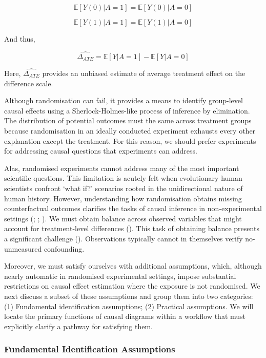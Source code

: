 \documentclass[
  singlecolumn,
  9pt]{article}
\begin{document}
\[
 \mathbb{E}[Y(0) | A = 1] = \mathbb{E}[Y(0) | A = 0] 
\]

\[
\mathbb{E}[Y(1) | A = 1] = \mathbb{E}[Y(1) | A = 0] 
\]

And thus,

\[
  \widehat{\Delta_{ATE}} = \mathbb{E}[Y | A = 1] - \mathbb{E}[Y | A = 0]
\]

Here, \(\widehat{\Delta_{ATE}}\) provides an unbiased estimate of
average treatment effect on the difference scale.

Although randomisation can fail, it provides a means to identify
group-level causal effects using a Sherlock-Holmes-like process of
inference by elimination. The distribution of potential outcomes must
the same across treatment groups because randomisation in an ideally
conducted experiment exhausts every other explanation except the
treatment. For this reason, we should prefer experiments for addressing
causal questions that experiments can address.

Alas, randomised experiments cannot address many of the most important
scientific questions. This limitation is acutely felt when evolutionary
human scientists confront `what if?' scenarios rooted in the
unidirectional nature of human history. However, understanding how
randomisation obtains missing counterfactual outcomes clarifies the
tasks of causal inference in non-experimental settings
(;
;
). We must obtain
balance across observed variables that might account for treatment-level
differences ().
This task of obtaining balance presents a significant challenge
(). Observations
typically cannot in themselves verify no-unmeasured confounding.

Moreover, we must satisfy ourselves with additional assumptions, which,
although nearly automatic in randomised experimental settings, impose
substantial restrictions on causal effect estimation where the exposure
is not randomised. We next discuss a subset of these assumptions and
group them into two categories: (1) Fundamental identification
assumptions; (2) Practical assumptions. We will locate the primary
functions of causal diagrams within a workflow that must explicitly
clarify a pathway for satisfying them.

\subsubsection{Fundamental Identification
Assumptions}\label{fundamental-identification-assumptions}
\end{document}
